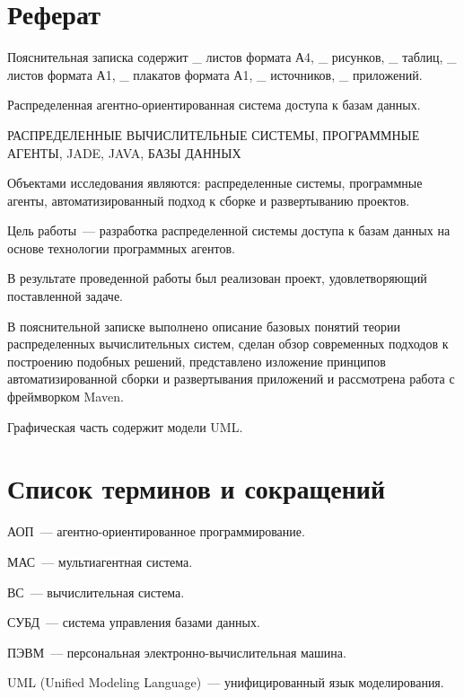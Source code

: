 \updateStamp
{}
\section*{Реферат}
Пояснительная записка содержит \_ листов формата А4, \_ рисунков, \_ таблиц, \_ листов формата А1, \_ плакатов формата А1, \_ источников, \_ приложений.

Распределенная агентно-ориентированная система доступа к базам данных.

РАСПРЕДЕЛЕННЫЕ ВЫЧИСЛИТЕЛЬНЫЕ СИСТЕМЫ, ПРОГРАММНЫЕ АГЕНТЫ, JADE, JAVA, БАЗЫ ДАННЫХ

Объектами исследования являются: распределенные системы, программные агенты, автоматизированный подход к сборке и развертыванию проектов.

Цель работы~--- разработка распределенной системы доступа к базам данных на основе технологии программных агентов.

В результате проведенной работы был реализован проект, удовлетворяющий поставленной задаче.

В пояснительной записке выполнено описание базовых понятий теории распределенных вычислительных систем, сделан обзор современных подходов к построению подобных решений,  представлено изложение принципов  автоматизированной сборки и развертывания приложений и рассмотрена работа с фреймворком Maven.

Графическая часть содержит модели UML.

\newpage
\section*{Список терминов и сокращений}
АОП~--- агентно-ориентированное программирование.

МАС~--- мультиагентная система.
 
ВС~--- вычислительная система.

СУБД~--- система управления базами данных.

ПЭВМ~--- персональная электронно-вычислительная машина.

UML (Unified Modeling Language)~--- унифицированный язык моделирования.
